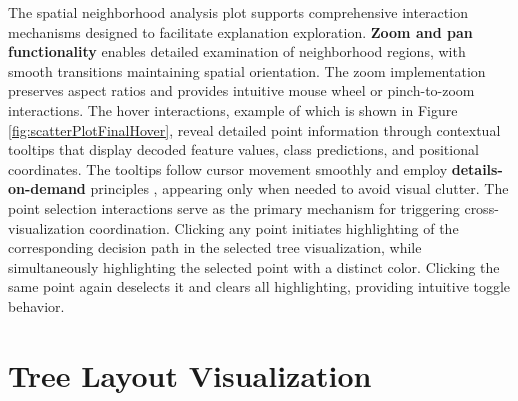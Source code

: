 The spatial neighborhood analysis plot supports comprehensive interaction mechanisms designed to facilitate explanation exploration. \textbf{Zoom and pan functionality} enables detailed examination of neighborhood regions, with smooth transitions maintaining spatial orientation. The zoom implementation preserves aspect ratios and provides intuitive mouse wheel or pinch-to-zoom interactions.
%
The hover interactions, example of which is shown in Figure \ref{fig:scatterPlotFinalHover}, reveal detailed point information through contextual tooltips that display decoded feature values, class predictions, and positional coordinates. The tooltips follow cursor movement smoothly and employ \textbf{details-on-demand} principles \cite{readingsInformationVi}, appearing only when needed to avoid visual clutter.
%
The point selection interactions serve as the primary mechanism for triggering cross-visualization coordination. Clicking any point initiates highlighting of the corresponding decision path in the selected tree visualization, while simultaneously highlighting the selected point with a distinct color. 
Clicking the same point again deselects it and clears all highlighting, providing intuitive toggle behavior.

\section{Tree Layout Visualization}

